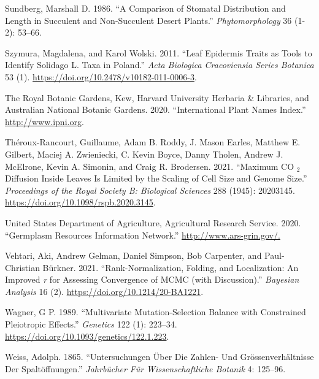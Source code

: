 \documentclass[
  12pt,
]{article}
\newlength{\cslhangindent}
\newlength{\cslentryspacingunit} %
\newenvironment{CSLReferences}[2] %
 {%
  \setlength{\parindent}{0pt}
  \ifodd #1
  \let\oldpar\par
  \def\par{\hangindent=\cslhangindent\oldpar}
  \fi
  \setlength{\parskip}{#2\cslentryspacingunit}
 }%
 {}
\begin{document}
\begin{CSLReferences}{1}{0}
\leavevmode{}%
Sundberg, Marshall D. 1986. {``A Comparison of Stomatal Distribution and Length in Succulent and Non-Succulent Desert Plants.''} \emph{Phytomorphology} 36 (1-2): 53--66.

\leavevmode{}%
Szymura, Magdalena, and Karol Wolski. 2011. {``Leaf {Epidermis} {Traits} as {Tools} to {Identify} {Solidago} {L}. {Taxa} in {Poland}.''} \emph{Acta Biologica Cracoviensia Series Botanica} 53 (1). \url{https://doi.org/10.2478/v10182-011-0006-3}.

\leavevmode{}%
The Royal Botanic Gardens, Kew, Harvard University Herbaria \& Libraries, and Australian National Botanic Gardens. 2020. {``International {Plant} {Names} {Index}.''} \url{http://www.ipni.org}.

\leavevmode{}%
Théroux-Rancourt, Guillaume, Adam B. Roddy, J. Mason Earles, Matthew E. Gilbert, Maciej A. Zwieniecki, C. Kevin Boyce, Danny Tholen, Andrew J. McElrone, Kevin A. Simonin, and Craig R. Brodersen. 2021. {``Maximum {CO} \(_{\textrm{2}}\) Diffusion Inside Leaves Is Limited by the Scaling of Cell Size and Genome Size.''} \emph{Proceedings of the Royal Society B: Biological Sciences} 288 (1945): 20203145. \url{https://doi.org/10.1098/rspb.2020.3145}.

\leavevmode{}%
United States Department of Agriculture, Agricultural Research Service. 2020. {``Germplasm {Resources} {Information} {Network}.''} \url{http://www.ars-grin.gov/.}

\leavevmode{}%
Vehtari, Aki, Andrew Gelman, Daniel Simpson, Bob Carpenter, and Paul-Christian Bürkner. 2021. {``Rank-{Normalization}, {Folding}, and {Localization}: {An} {Improved} \emph{r} for {Assessing} {Convergence} of {MCMC} (with {Discussion}).''} \emph{Bayesian Analysis} 16 (2). \url{https://doi.org/10.1214/20-BA1221}.

\leavevmode{}%
Wagner, G P. 1989. {``Multivariate Mutation-Selection Balance with Constrained Pleiotropic Effects.''} \emph{Genetics} 122 (1): 223--34. \url{https://doi.org/10.1093/genetics/122.1.223}.

\leavevmode{}%
Weiss, Adolph. 1865. {``Untersuchungen Über Die {Zahlen}- Und {Grössenverhältnisse} Der {Spaltöffnungen}.''} \emph{Jahrbücher Für Wissenschaftliche Botanik} 4: 125--96.


\end{CSLReferences}
\end{document}
